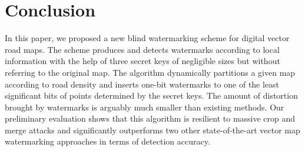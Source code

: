 \section{Conclusion}
\label{sec:conclude}

In this paper, we proposed a new blind watermarking scheme for digital vector
road maps. The scheme produces and detects watermarks according to local information
with the help of three secret keys of negligible sizes but without referring to
the original map. The algorithm dynamically partitions a given map according to
road density and inserts one-bit watermarks to one of the least significant bits
of points determined by the secret keys. The amount of distortion brought by
watermarks is arguably much smaller than existing methods.
Our preliminary evaluation shows that this algorithm 
is resilient to massive crop and merge attacks and significantly outperforms
two other state-of-the-art vector map watermarking approaches in terms of
detection accuracy.
%
